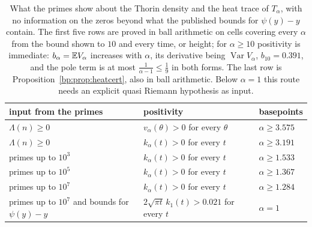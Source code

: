 \begin{table}[htbp]
\centering\small
\begin{tabular}{@{}lll@{}}
\toprule
input from the primes & positivity & basepoints\\
\midrule
$\Lambda(n)\ge0$ & $v_\alpha(\theta)>0$ for every $\theta$ & $\alpha\ge3.575$\\
$\Lambda(n)\ge0$ & $k_\alpha(t)>0$ for every $t$ & $\alpha\ge3.191$\\
primes up to $10^3$ & $k_\alpha(t)>0$ for every $t$ & $\alpha\ge1.533$\\
primes up to $10^5$ & $k_\alpha(t)>0$ for every $t$ & $\alpha\ge1.367$\\
primes up to $10^7$ & $k_\alpha(t)>0$ for every $t$ & $\alpha\ge1.284$\\
primes up to $10^7$ and bounds for $\psi(y)-y$ & $2\sqrt{\pi t}\,k_1(t)>0.021$ for every $t$ & $\alpha=1$\\
\bottomrule
\end{tabular}
\caption[What the primes show about the clocks $T_\alpha$]{What the primes show about the Thorin density and the heat trace of $T_\alpha$, with no information on the zeros beyond what the published bounds for $\psi(y)-y$ contain. The first five rows are proved in ball arithmetic on cells covering every $\alpha$ from the bound shown to $10$ and every time, or height; for $\alpha\ge10$ positivity is immediate: $b_\alpha=\mathbb{E} V_\alpha$ increases with $\alpha$, its derivative being $\operatorname{Var}V_\alpha$, $b_{10}=0.391$, and the pole term is at most $\frac1{\alpha-1}\le\frac19$ in both forms. The last row is Proposition~\ref{bp:prop:heatcert}, also in ball arithmetic. Below $\alpha=1$ this route needs an explicit quasi Riemann hypothesis as input.}
\label{bp:tab:heat}
\end{table}

